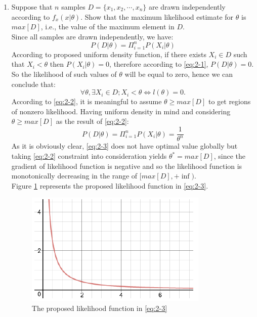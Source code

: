 \documentclass[12pt]{article}
\newcommand{\Pin}{\Pi_{i=1}^n}
\begin{document}
\begin{enumerate}
\item Suppose that $n$ samples $D = \{x_1 , x_2 , \cdots , x_n \}$ are drawn independently according to
$f_x(x|\theta)$. Show that the maximum likelihood estimate for $\theta$ is $max [D]$, i.e., the
value of the maximum element in $D$.\\

Since all samples are drawn independently, we have:
\begin{equation}
P(D|\theta) = \Pin P(X_i|\theta)
\label{eq:2-1}
\end{equation}
According to proposed uniform density function, if there exists $X_i \in D$ such that $X_i < \theta$ then $P(X_i|\theta) = 0$, therefore according to \eqref{eq:2-1}, $P(D|\theta) = 0$. So the likelihood of such values of $\theta$ will be equal to zero, hence we can conclude that:
\begin{equation}
\forall \theta, \exists X_i \in D; X_i < \theta \Leftrightarrow l(\theta) = 0.
\label{eq:2-2}
\end{equation}
According to \eqref{eq:2-2}, it is meaningful to assume $\theta \geq max[D]$ to get regions of nonzero likelihood. Having uniform density in mind and considering $\theta \geq max[D]$ as the result of \eqref{eq:2-2}:
\begin{equation}
P(D|\theta) = \Pin P(X_i|\theta) = \frac{1}{\theta^n} 
\label{eq:2-3}
\end{equation}
As it is obviously clear, \eqref{eq:2-3} does not have optimal value globally but taking \eqref{eq:2-2} constraint into consideration yields $\theta^* = max[D]$, since the gradient of likelihood function is negative and so the likelihood function is monotonically decreasing in the range of $[max[D], +\inf)$. \\
Figure \ref{fig:2-1} represents the proposed likelihood function in \eqref{eq:2-3}.
\begin{figure}[h]
\centering 
\includegraphics[scale=0.4]{Imgs/2-1.png}
\caption{The proposed likelihood function in \ref{eq:2-3}}
\label{fig:2-1}
\end{figure}



\end{enumerate}
\end{document}
